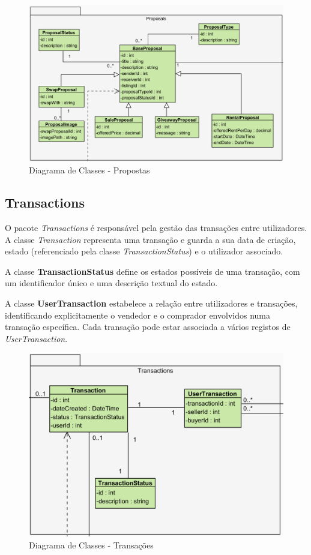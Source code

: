 \documentclass[a4paper, 12pt]{article} %
\begin{document}
\begin{figure}[ht]
	\centering
	\includegraphics[width=\textwidth]{../images/class-diagram-proposals.png}
	\caption{Diagrama de Classes - Propostas}
	\label{fig:class_diagram_proposals}
\end{figure}

\newpage
\subsection{Transactions}
O pacote \textit{Transactions} é responsável pela gestão das transações entre utilizadores. A classe \textit{Transaction} representa uma transação e guarda a sua data de criação, estado (referenciado pela classe \textit{TransactionStatus}) e o utilizador associado.

A classe \textbf{TransactionStatus} define os estados possíveis de uma transação, com um identificador único e uma descrição textual do estado.

A classe \textbf{UserTransaction} estabelece a relação entre utilizadores e transações, identificando explicitamente o vendedor e o comprador envolvidos numa transação específica. Cada transação pode estar associada a vários registos de \textit{UserTransaction}.

\begin{figure}[ht]
	\centering
	\includegraphics[width=\textwidth]{../images/class-diagram-transactions.png}
	\caption{Diagrama de Classes - Transações}
	\label{fig:class_diagram_transactions}
\end{figure}
\end{document}
